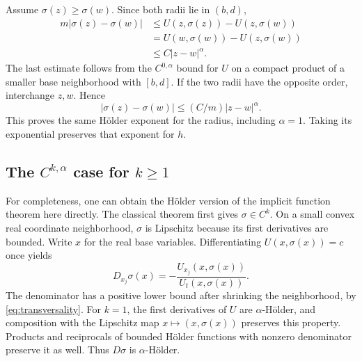\documentclass[11pt]{amsart}
\theoremstyle{definition}
\theoremstyle{remark}
\numberwithin{equation}{section}
\begin{document}
Assume $\sigma(z)\ge\sigma(w)$. Since both radii lie in $(b,d)$,
\begin{align*}
m|\sigma(z)-\sigma(w)|
&\le U(z,\sigma(z))-U(z,\sigma(w))\\
&=U(w,\sigma(w))-U(z,\sigma(w))\\
&\le C|z-w|^\alpha.
\end{align*}
The last estimate follows from the $C^{0,\alpha}$ bound for $U$ on
a compact product of a smaller base neighborhood with $[b,d]$.
If the two radii have the opposite order, interchange $z,w$. Hence
\begin{equation}\label{eq:holder-radius}
|\sigma(z)-\sigma(w)|\le(C/m)|z-w|^\alpha.
\end{equation}
This proves the same H\"older exponent for the radius, including
$\alpha=1$. Taking its exponential preserves that exponent for $h$.

\subsection{The \texorpdfstring{$C^{k,\alpha}$}{C-(k,alpha)} case for \texorpdfstring{$k\ge1$}{k at least 1}}

For completeness, one can obtain the H\"older version of the implicit
function theorem here directly. The classical theorem first gives
$\sigma\in C^k$. On a small convex real coordinate neighborhood,
$\sigma$ is Lipschitz because its first derivatives are bounded.
Write $x$ for the real base variables. Differentiating $U(x,\sigma(x))=c$
once yields
\begin{equation}\label{eq:first-derivative}
D_{x_j}\sigma(x)=-\frac{U_{x_j}(x,\sigma(x))}{U_t(x,\sigma(x))}.
\end{equation}
The denominator has a positive lower bound after shrinking the
neighborhood, by \eqref{eq:transversality}. For $k=1$, the first
derivatives of $U$ are $\alpha$-H\"older, and composition with the
Lipschitz map $x\mapsto(x,\sigma(x))$ preserves this property.
Products and reciprocals of bounded H\"older functions with nonzero
denominator preserve it as well. Thus $D\sigma$ is $\alpha$-H\"older.
\end{document}
